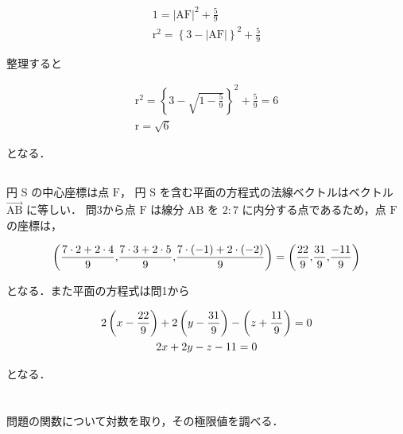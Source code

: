 \begin{gather*}
  1 = {\lvert\mathrm{AF}\lvert}^2 + \frac{5}{9} \\
  {\mathrm{r}}^2 = \left\{3 - \lvert\mathrm{AF}\lvert\right\}^2 + \frac{5}{9}
\end{gather*}

整理すると

\begin{gather*}
  {\mathrm{r}}^2 = \left\{3 - \sqrt{1 - \frac{5}{9}}\right\}^2 + \frac{5}{9} = 6 \\
  \mathrm{r} = \sqrt{6}
\end{gather*}

となる．


\subsection{}

円 $\mathrm{S}$ の中心座標は点 $\mathrm{F}$，
円 $\mathrm{S}$ を含む平面の方程式の法線ベクトルはベクトル 
$\overrightarrow{\mathrm{AB}}$ に等しい．
問3から点 $\mathrm{F}$ は線分 $\mathrm{AB}$ を $2\colon7$ に内分する点であるため，点 $\mathrm{F}$ の座標は，

\begin{gather*}
  \left\lparen {\frac{7 \cdot 2 + 2 \cdot 4}{9}} {,}
  {\frac{7 \cdot 3 + 2 \cdot 5}{9}} {,}
  {\frac{7 \cdot (-1) + 2 \cdot (-2)}{9}} \right\rparen
  =\left\lparen {\frac{22}{9}} {,}
  {\frac{31}{9}} {,}
  {\frac{-11}{9}} \right\rparen
\end{gather*}

となる．また平面の方程式は問1から

\begin{gather*}
  2 \left\lparen x - \frac{22}{9} \right\rparen +
  2 \left\lparen y - \frac{31}{9} \right\rparen -
  \left\lparen z + \frac{11}{9} \right\rparen = 0 \\
  2 x + 2 y - z - 11 = 0
\end{gather*}

となる．


\section{}


\subsection{}

問題の関数について対数を取り，その極限値を調べる．

